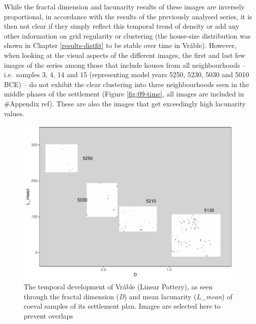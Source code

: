 \documentclass[
  12pt,
]{book}
\begin{document}
While the fractal dimension and lacunarity results of these images are inversely proportional, in accordance with the results of the previously analysed series, it is then not clear if they simply reflect this temporal trend of density or add any other information on grid regularity or clustering (the house-size distribution was shown in Chapter \ref{results-distfit} to be stable over time in Vráble). However, when looking at the visual aspects of the different images, the first and last few images of the series among those that include houses from all neighbourhoods -- i.e.~samples 3, 4, 14 and 15 (representing model years 5250, 5230, 5030 and 5010 BCE) -- do not exhibit the clear clustering into three neighbourhoods seen in the middle phases of the settlement (Figure \ref{fig:09-time}, all images are included in \#Appendix ref). These are also the images that get exceedingly high lacunarity values.

\begin{figure}
\hypertarget{09-time}{%
\centering
\includegraphics{Results/fig09_time.pdf}
\caption{The temporal development of Vráble (Linear Pottery), as seen through the fractal dimension (\emph{D}) and mean lacunarity (\emph{L\_mean}) of coeval samples of its settlement plan. Images are selected here to prevent overlaps}\label{09-time}
}
\end{figure}
\end{document}

